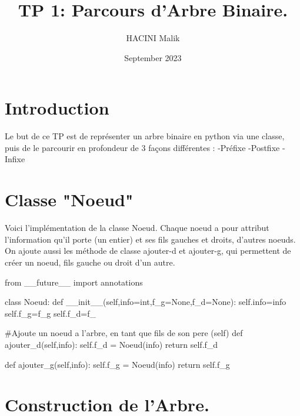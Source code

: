 \documentclass{article}
\title{TP 1: Parcours d'Arbre Binaire.}
\author{HACINI Malik}
\date{September 2023}
\begin{document}
\maketitle
\tableofcontents{}

\section{Introduction}

Le but de ce TP est de représenter un arbre binaire en python via une classe,
puis de le parcourir en profondeur de 3 façons différentes :
\newline
-Préfixe
\newline
-Postfixe
\newline
-Infixe


\section{Classe "Noeud"}
Voici l'implémentation de la classe Noeud.
Chaque noeud a pour attribut l'information qu'il porte (un entier) 
et ses fils gauches et droits, d'autres noeuds.
On ajoute aussi les méthode de classe ajouter-d et ajouter-g, qui
permettent de créer un noeud, fils gauche ou droit d'un autre.

\begin{python}
    from __future__ import annotations

class Noeud:
    def __init__(self,info=int,f_g=None,f_d=None):
        self.info=info
        self.f_g=f_g
        self.f_d=f_
        
    #Ajoute un noeud a l'arbre, en tant que fils de son pere (self)
    def ajouter_d(self,info):
        self.f_d = Noeud(info)
        return self.f_d
    
    def ajouter_g(self,info):
        self.f_g = Noeud(info)
        return self.f_g

\end{python}

\section{Construction de l'Arbre.}
\end{document}
